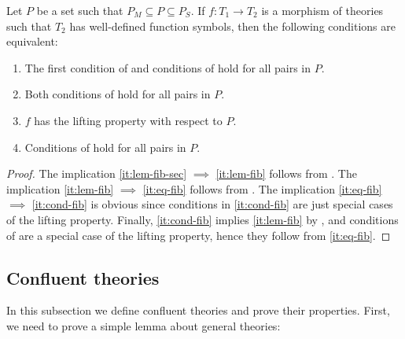\documentclass[reqno]{amsart}
\theoremstyle{definition}
\theoremstyle{remark}
\numberwithin{figure}{section}
\begin{document}
\begin{prop}
Let $P$ be a set such that $P_M \subseteq P \subseteq P_S$.
If $f : T_1 \to T_2$ is a morphism of theories such that $T_2$ has well-defined function symbols, then the following conditions are equivalent:
\begin{enumerate}
\item \label{it:lem-fib-sec} The first condition of  and conditions of  hold for all pairs in $P$.
\item \label{it:lem-fib} Both conditions of  hold for all pairs in $P$.
\item \label{it:eq-fib} $f$ has the lifting property with respect to $P$.
\item \label{it:cond-fib} Conditions of  hold for all pairs in $P$.
\end{enumerate}
\end{prop}
\begin{proof}
The implication \eqref{it:lem-fib-sec} $\implies$ \eqref{it:lem-fib} follows from .
The implication \eqref{it:lem-fib} $\implies$ \eqref{it:eq-fib} follows from .
The implication \eqref{it:eq-fib} $\implies$ \eqref{it:cond-fib} is obvious since conditions in \eqref{it:cond-fib} are just special cases of the lifting property.
Finally, \eqref{it:cond-fib} implies \eqref{it:lem-fib} by , and conditions of  are a special case of the lifting property, hence they follow from \eqref{it:eq-fib}.
\end{proof}

\subsection{Confluent theories}

In this subsection we define confluent theories and prove their properties.
First, we need to prove a simple lemma about general theories:
\end{document}
